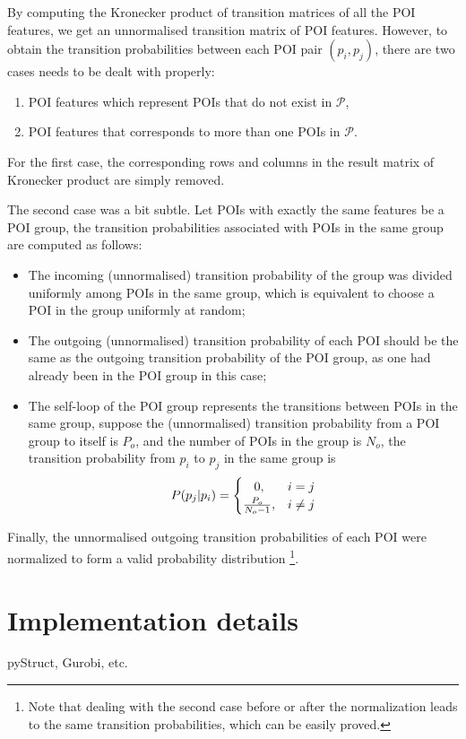 By computing the Kronecker product of transition matrices of all the POI features,
we get an unnormalised transition matrix of POI features.
However, to obtain the transition probabilities between each POI pair $(p_i, p_j)$,
there are two cases needs to be dealt with properly:
\begin{enumerate}
\item POI features which represent POIs that do not exist in $\mathcal{P}$,
\item POI features that corresponds to more than one POIs in $\mathcal{P}$.
\end{enumerate}

For the first case,
the corresponding rows and columns in the result matrix of Kronecker product are simply removed.

The second case was a bit subtle.
Let POIs with exactly the same features be a POI group,
the transition probabilities associated with POIs in the same group are computed as follows:
\begin{itemize}
\item The incoming (unnormalised) transition probability of the group was divided uniformly among POIs
      in the same group, which is equivalent to choose a POI in the group uniformly at random;
\item The outgoing (unnormalised) transition probability of each POI should be the same as the
      outgoing transition probability of the POI group, as one had already been in the POI group in this case;
\item The self-loop of the POI group represents the transitions between POIs in the same group,
      suppose the (unnormalised) transition probability from a POI group to itself is $P_o$,
      and the number of POIs in the group is $N_o$,
      the transition probability from $p_i$ to $p_j$ in the same group is
      \begin{displaymath}
          P(p_j | p_i) =
          \begin{cases}
              \hfill 0, \hfill & i = j \\
              \hfill \frac{P_o}{N_o - 1}, \hfill & i \ne j \\
          \end{cases}
      \end{displaymath}
\end{itemize}
Finally, the unnormalised outgoing transition probabilities of each POI were normalized to form
a valid probability distribution
\footnote{Note that dealing with the second case before or after the normalization leads to
the same transition probabilities, which can be easily proved. }.


\section{Implementation details}

pyStruct, Gurobi, etc.
